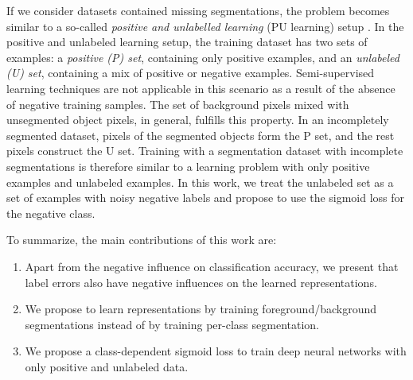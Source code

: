 If we consider datasets contained missing segmentations, the problem becomes similar to a so-called \textit{positive and unlabelled learning} (PU learning) setup \cite{li2005learning}.
In the positive and unlabeled learning setup, the training dataset has two sets of examples: a \textit{positive (P) set}, containing only positive examples, and an \textit{unlabeled (U) set}, containing a mix of positive or negative examples.
Semi-supervised learning techniques are not applicable in this scenario as a result of the absence of negative training samples.
The set of background pixels mixed with unsegmented object pixels, in general, fulfills this property.
In an incompletely segmented dataset, pixels of the segmented objects form the P set, and the rest pixels construct the U set.
Training with a segmentation dataset with incomplete segmentations is therefore similar to a learning problem with only positive examples and unlabeled examples.
In this work, we treat the unlabeled set as a set of examples with noisy negative labels and propose to use the sigmoid loss for the negative class.




To summarize, the main contributions of this work are:
\begin{enumerate}
  \item Apart from the negative influence on classification accuracy, we present that label errors also have negative influences on the learned representations.
  \item We propose to learn representations by training foreground/background segmentations instead of by training per-class segmentation.
  \item We propose a class-dependent sigmoid loss to train deep neural networks with only positive and unlabeled data.
\end{enumerate}

